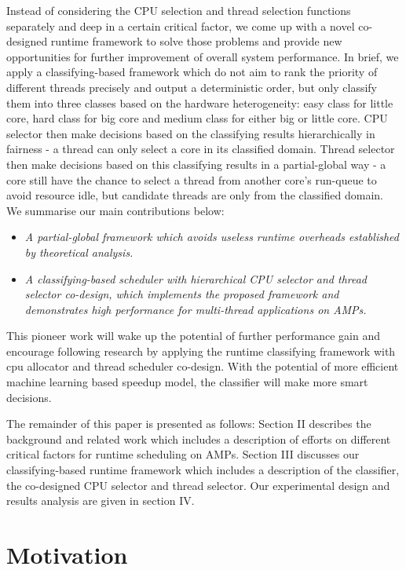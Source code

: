\documentclass[pageno]{jpaper}
\begin{document}
Instead of considering the CPU selection and thread selection functions separately and deep in a certain critical factor, we come up with a novel co-designed runtime framework to solve those problems and provide new opportunities for further improvement of overall system performance. In brief, we apply a classifying-based framework which do not aim to rank the priority of different threads precisely and output a deterministic order, but only classify them into three classes based on the hardware heterogeneity: easy class for little core, hard class for big core and medium class for either big or little core. CPU selector then make decisions based on the classifying results hierarchically in fairness - a thread can only select a core in its classified domain. Thread selector then make decisions based on this classifying results in a partial-global way - a core still have the chance to select a thread from another core's run-queue to avoid resource idle, but candidate threads are only from the classified domain. We summarise our main contributions below:
\begin{itemize}[]
\item {\it A partial-global framework which avoids useless runtime overheads established by theoretical analysis.} 
\item {\it A classifying-based scheduler with hierarchical CPU selector and thread selector co-design, which implements the proposed framework and demonstrates high performance for multi-thread applications on AMPs.} 
\end{itemize}
This pioneer work will wake up the potential of further performance gain and encourage following research by applying the runtime classifying framework with cpu allocator and thread scheduler co-design. With the potential of more efficient machine learning based speedup model, the classifier will make more smart decisions.  

The remainder of this paper is presented as follows: Section II describes the background and related work which includes a  description of efforts on different critical factors for runtime scheduling on AMPs. Section III discusses our classifying-based runtime framework which includes a description of the classifier, the co-designed CPU selector and thread selector. Our experimental design and results analysis are given in section IV. 

\section{Motivation}
\end{document}
